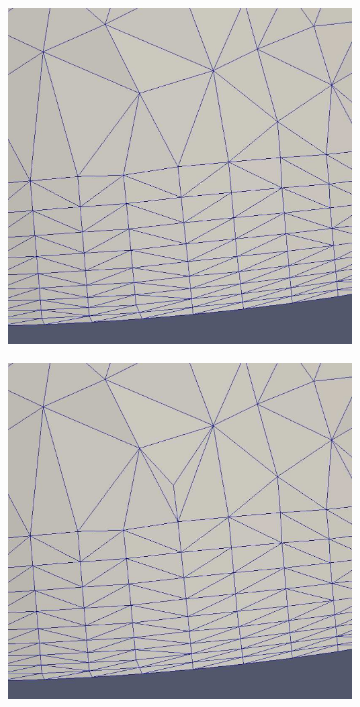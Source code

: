 \documentclass[conf]{new-aiaa}
\begin{document}
\begin{figure}[!hbt]
\centering
\begin{subfigure}{.4\textwidth}
  \centering
  \includegraphics[width=.8\linewidth]{point-insertion-swapping/initial.eps}
  \caption{}
  \label{point-insert1}
\end{subfigure}%
\begin{subfigure}{.4\textwidth}
  \centering
  \includegraphics[width=.8\linewidth]{point-insertion-swapping/point-inserted.eps}
  \caption{}
  \label{point-insert2}
\end{subfigure}
\begin{subfigure}{.4\textwidth}
  \centering

\end{subfigure}
\end{figure}
\end{document}
